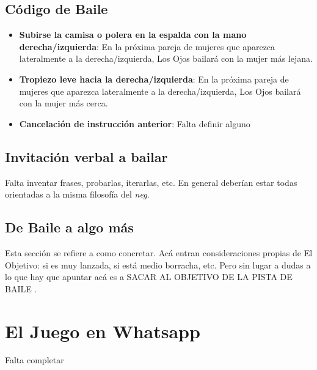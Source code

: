 \documentclass{article}
\begin{document}
\subsection{Código de Baile\label{ssec:codigoBaile}}
\begin{itemize}
\item \textbf{Subirse la camisa o polera en la espalda con la mano derecha/izquierda}: En la próxima pareja de mujeres que aparezca lateralmente a la derecha/izquierda, Los Ojos bailará con la mujer más lejana.
\item \textbf{Tropiezo leve hacia la derecha/izquierda}: En la próxima pareja de mujeres que aparezca lateralmente a la derecha/izquierda, Los Ojos bailará con la mujer más cerca.
\item \textbf{Cancelación de instrucción anterior}: {\color{red}Falta definir alguno}
\end{itemize}

\subsection{Invitación verbal a bailar \label{ssec:invitacionABailar}}
{\color{red}Falta inventar frases, probarlas, iterarlas, etc. En general deberían estar todas orientadas a la misma filosofía del \textit{neg}}.
\subsection{De Baile a algo más \label{ssec:baileAMas}}
{\color{red} Esta sección se refiere a como concretar. Acá entran consideraciones propias de El Objetivo: si es muy lanzada, si está medio borracha, etc. Pero sin lugar a dudas a lo que hay que apuntar acá es a SACAR AL OBJETIVO DE LA PISTA DE BAILE }.

\section{El Juego en Whatsapp \label{sec:whatsapp}}
{\color{red}Falta completar}
\end{document}
